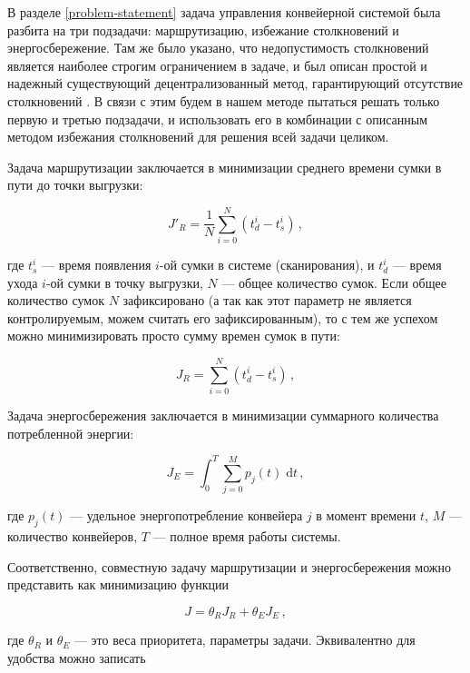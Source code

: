 \documentclass[specification,annotation,times]{itmo-student-thesis}
\theoremstyle{definition}
\begin{document}
В разделе \ref{problem-statement} задача управления конвейерной системой была
разбита на три подзадачи: маршрутизацию, избежание столкновений и
энергосбережение. Там же было указано, что недопустимость столкновений является
наиболее строгим ограничением в задаче, и был описан простой и надежный
существующий децентрализованный метод, гарантирующий отсутствие столкновений
\cite{black2009intelligent}. В связи с этим будем в нашем методе пытаться решать
только первую и третью подзадачи, и использовать его в комбинации с описанным
методом избежания столкновений для решения всей задачи целиком.

Задача маршрутизации заключается в минимизации среднего времени сумки в пути до
точки выгрузки:

\begin{equation}\label{eqs:J_r_avg}
  J'_R = \frac{1}{N} \sum\limits_{i=0}^{N} (t_d^i - t_s^i) \,,
\end{equation}

где $t_s^i$ --- время появления $i$-ой сумки в системе (сканирования), и
$t_d^i$ --- время ухода $i$-ой сумки в точку выгрузки, $N$ --- общее количество
сумок. Если общее количество сумок $N$ зафиксировано (а так как этот параметр не
является контролируемым, можем считать его зафиксированным), то с тем же успехом
можно минимизировать просто сумму времен сумок в пути:

\begin{equation}\label{eqs:J_r}
  J_R = \sum\limits_{i=0}^{N} (t_d^i - t_s^i) \,,
\end{equation}

Задача энергосбережения заключается в минимизации суммарного количества
потребленной энергии:

\begin{equation}\label{eqs:J_e}
  J_E = \int_0^T \! \sum\limits_{j=0}^{M} p_j(t) \; \mathrm{d}t \,,
\end{equation}

где $p_j(t)$ --- удельное энергопотребление конвейера $j$ в момент времени $t$,
$M$ --- количество конвейеров, $T$ --- полное время работы системы.

Соответственно, совместную задачу маршрутизации и энергосбережения можно
представить как минимизацию функции 

\begin{equation}
  J = \theta_R J_R + \theta_E J_E \,,
\end{equation}

где $\theta_R$ и $\theta_E$ --- это веса приоритета, параметры задачи.
Эквивалентно для удобства можно записать
\end{document}

